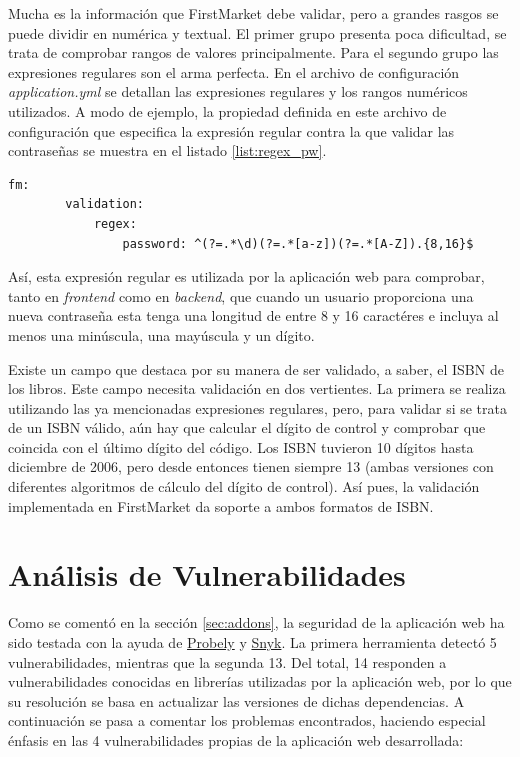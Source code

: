 \documentclass[a4paper,12pt,twoside,openright]{report}
\begin{document}
	Mucha es la información que FirstMarket debe validar, pero a grandes rasgos se puede dividir en numérica y textual. El primer grupo presenta poca dificultad, se trata de comprobar rangos de valores principalmente. Para el segundo grupo las expresiones regulares son el arma perfecta. En el archivo de configuración \emph{application.yml} se detallan las expresiones regulares y los rangos numéricos utilizados. A modo de ejemplo, la propiedad definida en este archivo de configuración que especifica la expresión regular contra la que validar las contraseñas se muestra en el listado \ref{list:regex_pw}.
	\\
	
	\begin{lstlisting}[caption=Expresión regular para las contraseñas,label=list:regex_pw]
	fm:
		validation:
			regex:
				password: ^(?=.*\d)(?=.*[a-z])(?=.*[A-Z]).{8,16}$
	\end{lstlisting}
	
	Así, esta expresión regular es utilizada por la aplicación web para comprobar, tanto en \emph{frontend} como en \emph{backend}, que cuando un usuario proporciona una nueva contraseña esta tenga una longitud de entre 8 y 16 caractéres e incluya al menos una minúscula, una mayúscula y un dígito.
	
	Existe un campo que destaca por su manera de ser validado, a saber, el ISBN de los libros. Este campo necesita validación en dos vertientes. La primera se realiza utilizando las ya mencionadas expresiones regulares, pero, para validar si se trata de un ISBN válido, aún hay que calcular el dígito de control y comprobar que coincida con el último dígito del código. Los ISBN tuvieron 10 dígitos hasta diciembre de 2006, pero desde entonces tienen siempre 13 (ambas versiones con diferentes algoritmos de cálculo del dígito de control). Así pues, la validación implementada en FirstMarket da soporte a ambos formatos de ISBN.
	
	\section{Análisis de Vulnerabilidades} \label{sec:vulnerabilities}
	Como se comentó en la sección \ref{sec:addons}, la seguridad de la aplicación web ha sido testada con la ayuda de \href{https://probely.com/}{Probely} y \href{https://snyk.io/}{Snyk}. La primera herramienta detectó 5 vulnerabilidades, mientras que la segunda 13. Del total, 14 responden a vulnerabilidades conocidas en librerías utilizadas por la aplicación web, por lo que su resolución se basa en actualizar las versiones de dichas dependencias. A continuación se pasa a comentar los problemas encontrados, haciendo especial énfasis en las 4 vulnerabilidades propias de la aplicación web desarrollada: 
	
\end{document}
